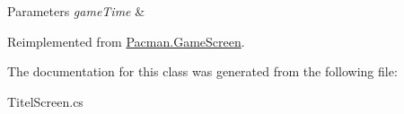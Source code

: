 \begin{DoxyParams}{Parameters}
{\em game\-Time} & \\
\hline
\end{DoxyParams}


Reimplemented from \hyperlink{class_pacman_1_1_game_screen_a768b26cbc3ed823d0dcba5055ae9a8b4}{Pacman.\-Game\-Screen}.



The documentation for this class was generated from the following file\-:\begin{DoxyCompactItemize}
\item 
Titel\-Screen.\-cs\end{DoxyCompactItemize}
